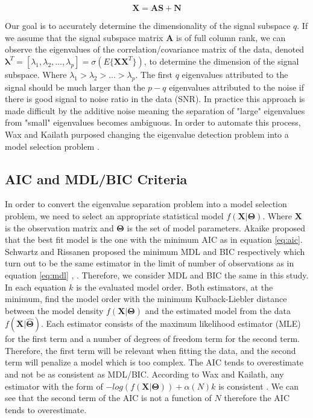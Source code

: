 \documentclass[journal]{IEEEtran}
\begin{document}
\begin{equation}
\label{eq:all}
\bm{X} = \bm{A}\bm{S} + \bm{N}
\end{equation}

\par Our goal is to accurately determine the dimensionality of the signal subspace \(q\). If we assume that the signal subspace matrix \(\bm{A}\) is of full column rank, we can observe the eigenvalues of the correlation/covariance matrix of the data, denoted \(\bm{\lambda}^T = [\lambda_1, \lambda_2, \dots, \lambda_p] = \sigma(E\{\bm{X}\bm{X}^T\})\), to determine the dimension of the signal subspace. Where \(\lambda_1 > \lambda_2 > \dots > \lambda_p\). The first \(q\) eigenvalues attributed to the signal should be much larger than the \(p-q\) eigenvalues attributed to the noise if there is good signal to noise ratio in the data (SNR). In practice this approach is made difficult by the additive noise meaning the separation of "large" eigenvalues from "small" eigenvalues becomes ambiguous. In order to automate this process, Wax and Kailath purposed changing the eigenvalue detection problem into a model selection problem \cite{wax}. 

\subsection{AIC and MDL/BIC Criteria}
\par In order to convert the eigenvalue separation problem into a model selection problem, we need to select an appropriate statistical model \(f(\bm{X} | \bm{\Theta})\). Where \(\bm{X}\) is the observation matrix and \(\bm{\Theta}\) is the set of model parameters. Akaike proposed that the best fit model is the one with the minimum AIC \cite{akaike} as in equation \ref{eq:aic}. Schwartz and Rissanen proposed the minimum MDL and BIC respectively which turn out to be the same estimator in the limit of number of observations as in equation \ref{eq:mdl} \cite{rissanen}, \cite{schwarz}. Therefore, we consider MDL and BIC the same in this study. In each equation \(k\) is the evaluated model order. Both estimators, at the minimum, find the model order with the minimum Kulback-Liebler distance between the model density \(f(\bm{X}|\bm{\Theta})\) and the estimated model from the data \(f(\bm{X}|\hat{\bm{\Theta}})\). Each estimator consists of the maximum likelihood estimator (MLE) for the first term and a number of degrees of freedom term for the second term. Therefore, the first term will be relevant when fitting the data, and the second term will penalize a model which is too complex. The AIC tends to overestimate and not be as consistent as MDL/BIC. According to Wax and Kailath, any estimator with the form of \(-log(f(\bm{X}|\bm{\Theta})) + \alpha(N)k\) is consistent \cite{wax}. We can see that the second term of the AIC is not a function of \(N\) therefore the AIC tends to overestimate.
\end{document}
